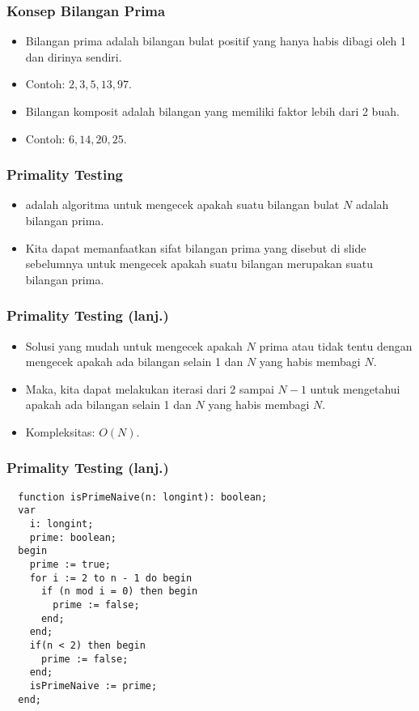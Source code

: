 \begin{frame}
\frametitle{Konsep Bilangan Prima}
\begin{itemize}
  \item Bilangan prima adalah bilangan bulat positif yang hanya habis dibagi oleh 1 dan dirinya sendiri.
  \item Contoh: $2, 3, 5, 13, 97$.
  \item Bilangan komposit adalah bilangan yang memiliki faktor lebih dari 2 buah.
  \item Contoh: $6, 14, 20, 25$.
\end{itemize}
\end{frame}

\begin{frame}
\frametitle{Primality Testing}
\begin{itemize}
  \item {} adalah algoritma untuk mengecek apakah suatu bilangan bulat $N$ adalah bilangan prima.
  \item Kita dapat memanfaatkan sifat bilangan prima yang disebut di slide sebelumnya untuk mengecek apakah suatu bilangan merupakan suatu bilangan prima. 
\end{itemize}
\end{frame}

\begin{frame}
\frametitle{Primality Testing (lanj.)}
\begin{itemize}
  \item Solusi yang mudah untuk mengecek apakah $N$ prima atau tidak tentu dengan mengecek apakah ada bilangan selain 1 dan $N$ yang habis membagi $N$.
  \item Maka, kita dapat melakukan iterasi dari 2 sampai $N-1$ untuk mengetahui apakah ada bilangan selain 1 dan $N$ yang habis membagi $N$.
  \item Kompleksitas: $O(N)$.
\end{itemize}
\end{frame}

\begin{frame}[fragile]
\frametitle{Primality Testing (lanj.)}
\begin{lstlisting}
  function isPrimeNaive(n: longint): boolean;
  var
    i: longint;
    prime: boolean;
  begin
    prime := true;
    for i := 2 to n - 1 do begin
      if (n mod i = 0) then begin
        prime := false;
      end;
    end;
    if(n < 2) then begin
      prime := false;
    end;
    isPrimeNaive := prime;
  end;  
\end{lstlisting}
\end{frame}

